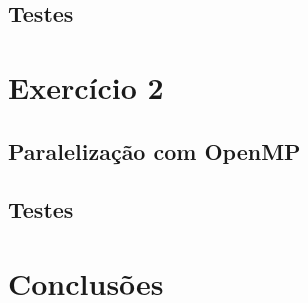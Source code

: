\documentclass[a4paper, 12pt]{article}
\begin{document}
\subsection{Testes}

\section{Exercício 2}

\subsection{Paralelização com OpenMP}

\subsection{Testes}

\section{Conclusões}

%
%
\end{document}
